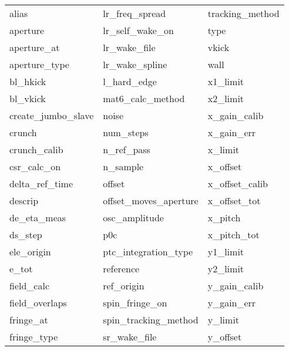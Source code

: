  \begin{tabular}{lll} \toprule
alias                       & lr_freq_spread              & tracking_method             \\
aperture                    & lr_self_wake_on             & type                        \\
aperture_at                 & lr_wake_file                & vkick                       \\
aperture_type               & lr_wake_spline              & wall                        \\
bl_hkick                    & l_hard_edge                 & x1_limit                    \\
bl_vkick                    & mat6_calc_method            & x2_limit                    \\
create_jumbo_slave          & noise                       & x_gain_calib                \\
crunch                      & num_steps                   & x_gain_err                  \\
crunch_calib                & n_ref_pass                  & x_limit                     \\
csr_calc_on                 & n_sample                    & x_offset                    \\
delta_ref_time              & offset                      & x_offset_calib              \\
descrip                     & offset_moves_aperture       & x_offset_tot                \\
de_eta_meas                 & osc_amplitude               & x_pitch                     \\
ds_step                     & p0c                         & x_pitch_tot                 \\
ele_origin                  & ptc_integration_type        & y1_limit                    \\
e_tot                       & reference                   & y2_limit                    \\
field_calc                  & ref_origin                  & y_gain_calib                \\
field_overlaps              & spin_fringe_on              & y_gain_err                  \\
fringe_at                   & spin_tracking_method        & y_limit                     \\
fringe_type                 & sr_wake_file                & y_offset                    \\

\end{tabular}
